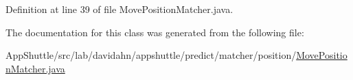 \-Definition at line 39 of file \-Move\-Position\-Matcher.\-java.



\-The documentation for this class was generated from the following file\-:\begin{DoxyCompactItemize}
\item 
\-App\-Shuttle/src/lab/davidahn/appshuttle/predict/matcher/position/\hyperlink{_move_position_matcher_8java}{\-Move\-Position\-Matcher.\-java}\end{DoxyCompactItemize}
